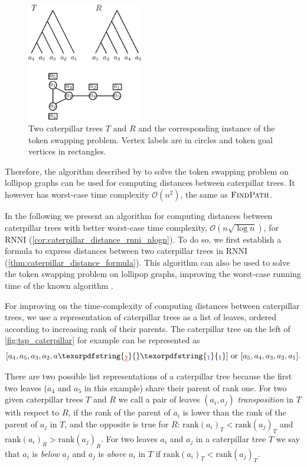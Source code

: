 \documentclass[11pt]{amsart}
\newcommand{\rnni}{\mathrm{RNNI}}
\newcommand{\findpath}{\textsc{FindPath}}
\newcommand{\rank}{\mathrm{rank}}
\renewcommand{\O}{\mathcal O}
\providecommand{\DIFaddtex}[1]{{\protect\color{blue}\uwave{#1}}} %
\providecommand{\DIFdeltex}[1]{{\protect\color{red}\sout{#1}}}                      %
\providecommand{\DIFaddbegin}{} %
\providecommand{\DIFaddend}{} %
\providecommand{\DIFdelbegin}{} %
\providecommand{\DIFdelend}{} %
\providecommand{\DIFadd}[1]{\texorpdfstring{\DIFaddtex{#1}}{#1}} %
\providecommand{\DIFdel}[1]{\texorpdfstring{\DIFdeltex{#1}}{}} %
\newcommand{\DIFscaledelfig}{0.5}
\newlength{\DIFdelgraphicswidth} %
\newlength{\DIFdelgraphicsheight} %
\newcommand{\DIFaddincludegraphics}[2][]{{\color{blue}\fbox{\DIFOincludegraphics[#1]{#2}}}} %
\newcommand{\DIFdelincludegraphics}[2][]{%
\sbox{\DIFdelgraphicsbox}{\DIFOincludegraphics[#1]{#2}}%
\settoboxwidth{\DIFdelgraphicswidth}{\DIFdelgraphicsbox} %
\settoboxtotalheight{\DIFdelgraphicsheight}{\DIFdelgraphicsbox} %
\scalebox{\DIFscaledelfig}{%
\parbox[b]{\DIFdelgraphicswidth}{\usebox{\DIFdelgraphicsbox}\\[-\baselineskip] \rule{\DIFdelgraphicswidth}{0em}}\llap{\resizebox{\DIFdelgraphicswidth}{\DIFdelgraphicsheight}{%
\setlength{\unitlength}{\DIFdelgraphicswidth}%
\begin{picture}(1,1)%
\thicklines\linethickness{2pt} %
{\color[rgb]{1,0,0}\put(0,0){\framebox(1,1){}}}%
{\color[rgb]{1,0,0}\put(0,0){\line( 1,1){1}}}%
{\color[rgb]{1,0,0}\put(0,1){\line(1,-1){1}}}%
\end{picture}%
}\hspace*{3pt}}} %
} %
\DeclareRobustCommand{\DIFaddbegin}{\DIFOaddbegin \let\includegraphics\DIFaddincludegraphics} %
\DeclareRobustCommand{\DIFaddend}{\DIFOaddend \let\includegraphics\DIFOincludegraphics} %
\DeclareRobustCommand{\DIFdelbegin}{\DIFOdelbegin \let\includegraphics\DIFdelincludegraphics} %
\DeclareRobustCommand{\DIFdelend}{\DIFOaddend \let\includegraphics\DIFOincludegraphics} %
\begin{document}
\begin{figure}[ht]
	\includegraphics[width=0.45\textwidth]{tsp_caterpillar.eps}
	\caption{Two caterpillar trees $T$ and $R$ and the corresponding instance of the token swapping problem.
	Vertex labels are in circles and token goal vertices in rectangles.}
	\label{fig:tsp_caterpillar}
\end{figure}

Therefore, the algorithm described by \textcite{Kawahara2017-ey} to solve the token swapping problem on lollipop graphs can be used for computing distances between caterpillar trees.
It however has worst-case time complexity $\O(n^2)$, the same as $\findpath$.

In the following we present an algorithm for computing distances between caterpillar trees with better worst-case time complexity, $\O(n \sqrt{\log n})$, for $\rnni$ (\autoref{cor:caterpillar_distance_rnni_nlogn}).
To do so, we first establish a formula to express distances between two caterpillar trees in $\rnni$ (\autoref{thm:caterpillar_distance_formula}).
This algorithm can also be used to solve the token swapping problem on lollipop graphs, improving the worst-case running time of the known algorithm \autocite{Kawahara2017-ey}.

For improving on the time-complexity of computing distances between caterpillar trees, we use a representation of caterpillar trees as a list of leaves, ordered according to increasing rank of their parents.
The caterpillar tree on the left of \autoref{fig:tsp_caterpillar} for example can be represented as 
\[[a_4,a_5,a_3,a_2,a\DIFdelbegin \DIFdel{_2}\DIFdelend \DIFaddbegin \DIFadd{_1}\DIFaddend ] \text{ or }[a_5,a_4,a_3,a_2,a_1].\]
There are two possible list representations of a caterpillar tree because the first two leaves ($a_4$ and $a_5$ in this example) share their parent of rank one.
For two given caterpillar trees $T$ and $R$ we call a pair of leaves $(a_i,a_j)$ \emph{transposition} in $T$ with respect to $R$, if the rank of the parent of $a_i$ is lower than the rank of the parent of $a_j$ in $T$, and the opposite is true for $R$: $\rank(a_i)_T < \rank(a_j)_T$ and $\rank(a_i)_R > \rank(a_j)_R$.
For two leaves $a_i$ and $a_j$ in a caterpillar tree $T$ we say that $a_i$ is \emph{below} $a_j$ and $a_j$ is \emph{above} $a_i$ in $T$ if $\rank(a_i)_T < \rank(a_j)_T$.
\end{document}
